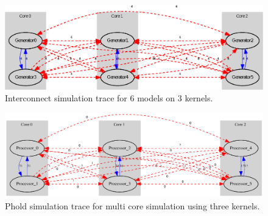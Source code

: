 \begin{figure}
    \center
    \includegraphics[width=\plotfraction\columnwidth]{fig/interconnect_parallel_allocation.eps}
    \caption{Interconnect simulation trace for 6 models on 3 kernels.}
    \label{fig:interconnect_allocation_parallel}
\end{figure}

\begin{figure}
    \center
    \includegraphics[width=\plotfraction\columnwidth]{fig/phold_parallel_allocation.eps}
    \caption{Phold simulation trace for multi core simulation using three kernels.}
    \label{fig:phold_allocation}
\end{figure}
